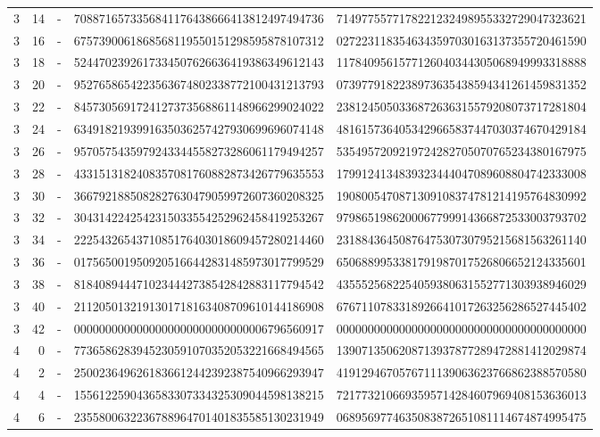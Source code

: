 \begin{longtable}{rrrll}
3 & 14 & - & 7088716573356841176438666413812497494736 & 7149775577178221232498955332729047323621 \\
3 & 16 & - & 6757390061868568119550151298595878107312 & 0272231183546343597030163137355720461590 \\
3 & 18 & - & 5244702392617334507626636419386349612143 & 1178409561577126040344305068949993318888 \\
3 & 20 & - & 9527658654223563674802338772100431213793 & 0739779182238973635438594341261459831352 \\
3 & 22 & - & 8457305691724127373568861148966299024022 & 2381245050336872636315579208073717281804 \\
3 & 24 & - & 6349182193991635036257427930699696074148 & 4816157364053429665837447030374670429184 \\
3 & 26 & - & 9570575435979243344558273286061179494257 & 5354957209219724282705070765234380167975 \\
3 & 28 & - & 4331513182408357081760882873426779635553 & 1799124134839323444047089608804742333008 \\
3 & 30 & - & 3667921885082827630479059972607360208325 & 1908005470871309108374781214195764830992 \\
3 & 32 & - & 3043142242542315033554252962458419253267 & 9798651986200067799914366872533003793702 \\
3 & 34 & - & 2225432654371085176403018609457280214460 & 2318843645087647530730795215681563261140 \\
3 & 36 & - & 0175650019509205166442831485973017799529 & 6506889953381791987017526806652124335601 \\
3 & 38 & - & 8184089444710234442738542842883117794542 & 4355525682254059380631552771303938946029 \\
3 & 40 & - & 2112050132191301718163408709610144186908 & 6767110783318926641017263256286527445402 \\
3 & 42 & - & 0000000000000000000000000000006796560917 & 0000000000000000000000000000000000000000 \\
4 & 0 & - & 7736586283945230591070352053221668494565 & 1390713506208713937877289472881412029874 \\
4 & 2 & - & 2500236496261836612442392387540966293947 & 4191294670576711139063623766862388570580 \\
4 & 4 & - & 1556122590436583307334325309044598138215 & 7217732106693595714284607969408153636013 \\
4 & 6 & - & 2355800632236788964701401835585130231949 & 0689569774635083872651081114674874995475 \\

\end{longtable}
